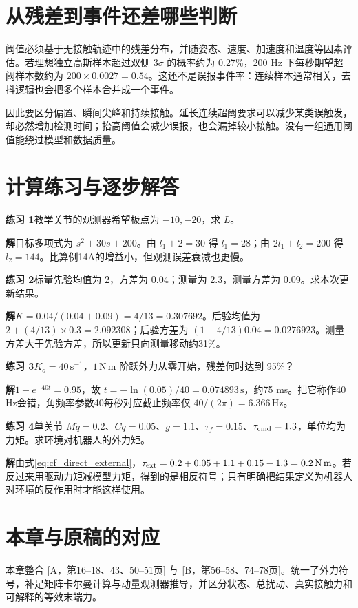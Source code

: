 \section{从残差到事件还差哪些判断}

阈值必须基于无接触轨迹中的残差分布，并随姿态、速度、加速度和温度等因素评估。若理想独立高斯样本超过双侧 $3\sigma$ 的概率约为 0.27\%，200 Hz 下每秒期望超阈样本数约为 $200\times0.0027=0.54$。这还不是误报事件率：连续样本通常相关，去抖逻辑也会把多个样本合并成一个事件。

因此要区分偏置、瞬间尖峰和持续接触。延长连续超阈要求可以减少某类误触发，却必然增加检测时间；抬高阈值会减少误报，也会漏掉较小接触。没有一组通用阈值能绕过模型和数据质量。

\section{计算练习与逐步解答}

\textbf{练习 1}\quad 教学关节的观测器希望极点为 $-10,-20$，求 $L$。

\textbf{解}\quad 目标多项式为 $s^2+30s+200$。由 $l_1+2=30$ 得 $l_1=28$；由 $2l_1+l_2=200$ 得 $l_2=144$。比算例14A的增益小，但观测误差衰减也更慢。

\textbf{练习 2}\quad 标量先验均值为 2，方差为 0.04；测量为 2.3，测量方差为 0.09。求本次更新结果。

\textbf{解}\quad $K=0.04/(0.04+0.09)=4/13=0.307692$。后验均值为 $2+(4/13)\times0.3=2.092308$；后验方差为 $(1-4/13)0.04=0.0276923$。测量方差大于先验方差，所以更新只向测量移动约31\%。

\textbf{练习 3}\quad $K_o=40\,\mathrm{s^{-1}}$，$1\,\mathrm{N\,m}$ 阶跃外力从零开始，残差何时达到 95\%？

\textbf{解}\quad $1-e^{-40t}=0.95$，故 $t=-\ln(0.05)/40=0.074893\,\mathrm{s}$，约75 ms。把它称作40 Hz会错，角频率参数40每秒对应截止频率仅 $40/(2\pi)=6.366\,\mathrm{Hz}$。

\textbf{练习 4}\quad 单关节 $M\ddot q=0.2$、$C\dot q=0.05$、$g=1.1$、$\tau_f=0.15$、$\tau_{\rm cmd}=1.3$，单位均为力矩。求环境对机器人的外力矩。

\textbf{解}\quad 由式\eqref{eq:cf_direct_external}，$\tau_{\rm ext}=0.2+0.05+1.1+0.15-1.3=0.2\,\mathrm{N\,m}$。若反过来用驱动力矩减模型力矩，得到的是相反符号；只有明确把结果定义为机器人对环境的反作用时才能这样使用。

\section*{本章与原稿的对应}
本章整合 [A，第16--18、43、50--51页] 与 [B，第56--58、74--78页]。统一了外力符号，补足矩阵卡尔曼计算与动量观测器推导，并区分状态、总扰动、真实接触力和可解释的等效末端力。
